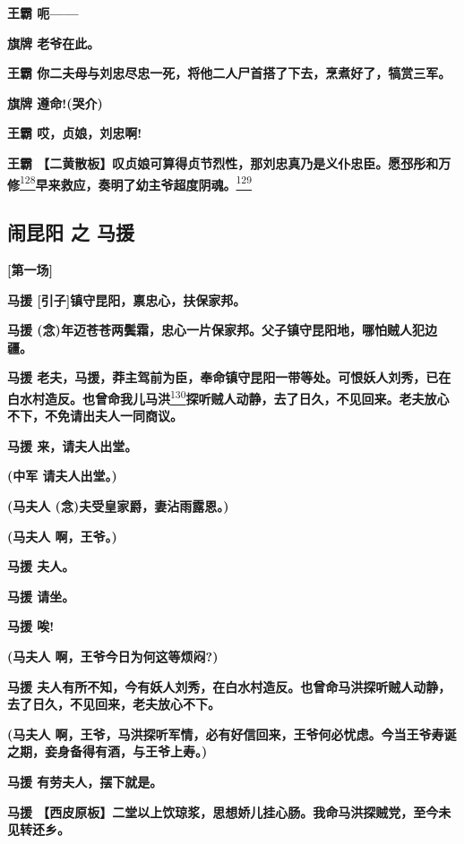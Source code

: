 \textbf{王霸 呃------}

\textbf{旗牌 老爷在此。}

\textbf{王霸
你二夫母与刘忠尽忠一死，将他二人尸首搭了下去，烹煮好了，犒赏三军。}

\textbf{旗牌 遵命!(哭介)}

\textbf{王霸 哎，贞娘，刘忠啊!}

\textbf{王霸
【二黄散板】叹贞娘可算得贞节烈性，那刘忠真乃是义仆忠臣。愿邳彤和万修}\protect\hyperlink{fn128}{\textsuperscript{128}}\textbf{早来救应，奏明了幼主爷超度阴魂。}\protect\hyperlink{fn129}{\textsuperscript{129}}

\hypertarget{ux95f9ux6606ux9633-ux4e4b-ux9a6cux63f4}{%
\subsection{闹昆阳 之
马援}\label{ux95f9ux6606ux9633-ux4e4b-ux9a6cux63f4}}

\textbf{{[}第一场{]}}

\textbf{马援 {[}引子{]}镇守昆阳，禀忠心，扶保家邦。}

\textbf{马援
(念)年迈苍苍两鬓霜，忠心一片保家邦。父子镇守昆阳地，哪怕贼人犯边疆。}

\textbf{马援
老夫，马援，莽主驾前为臣，奉命镇守昆阳一带等处。可恨妖人刘秀，已在白水村造反。也曾命我儿马洪}\protect\hyperlink{fn130}{\textsuperscript{130}}\textbf{探听贼人动静，去了日久，不见回来。老夫放心不下，不免请出夫人一同商议。}

\textbf{马援 来，请夫人出堂。}

\textbf{(中军 请夫人出堂。)}

\textbf{(马夫人 (念)夫受皇家爵，妻沾雨露恩。)}

\textbf{(马夫人 啊，王爷。)}

\textbf{马援 夫人。}

\textbf{马援 请坐。}

\textbf{马援 唉!}

\textbf{(马夫人 啊，王爷今日为何这等烦闷?)}

\textbf{马援
夫人有所不知，今有妖人刘秀，在白水村造反。也曾命马洪探听贼人动静，去了日久，不见回来，老夫放心不下。}

\textbf{(马夫人
啊，王爷，马洪探听军情，必有好信回来，王爷何必忧虑。今当王爷寿诞之期，妾身备得有酒，与王爷上寿。)}

\textbf{马援 有劳夫人，摆下就是。}

\textbf{马援
【西皮原板】二堂以上饮琼浆，思想娇儿挂心肠。我命马洪探贼党，至今未见转还乡。}

